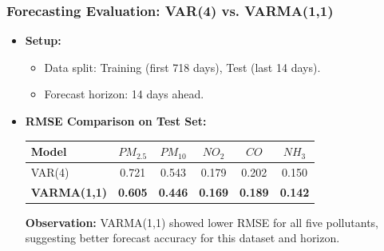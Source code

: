 \documentclass[svgnames, 12pt]{beamer}
\begin{document}
\begin{frame}
    \frametitle{Forecasting Evaluation: VAR(4) vs. VARMA(1,1)}
    \begin{itemize}
        \item \textbf{Setup:}
            \begin{itemize}
                \item Data split: Training (first 718 days), Test (last 14 days).
                \item Forecast horizon: 14 days ahead.
            \end{itemize}
        \item \textbf{RMSE Comparison on Test Set:}
            \begin{center}
            \footnotesize
            \begin{tabular}{lccccc}
                \toprule
                Model      & $PM_{2.5}$ & $PM_{10}$ & $NO_2$ & $CO$  & $NH_3$ \\
                \midrule
                VAR(4)     & 0.721      & 0.543     & 0.179  & 0.202 & 0.150  \\
                \textbf{VARMA(1,1)} & \textbf{0.605} & \textbf{0.446} & \textbf{0.169} & \textbf{0.189} & \textbf{0.142} \\
                \bottomrule
            \end{tabular}
            \end{center}
            \vspace{0.2cm}
            \textbf{Observation:} VARMA(1,1) showed lower RMSE for all five pollutants, suggesting better forecast accuracy for this dataset and horizon.
    \end{itemize}
\end{frame}
\end{document}
